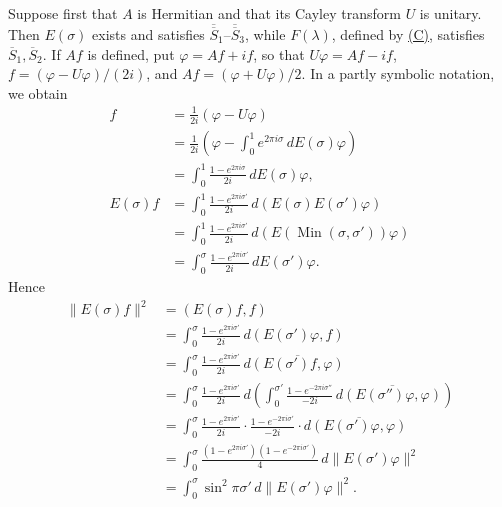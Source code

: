 \documentclass[fontsize=13pt,twoside,openany,headings=normal,parskip=false,bookmarkpackage=false,DIV=calc]{scrbook}
\begin{document}
Suppose first that $A$ is Hermitian and that its Cayley transform $U$ is unitary. Then $E(\sigma)$ exists and satisfies $\hyperref[cond:II.Sdouble1]{\overline{\overline S}_1}$--$\hyperref[cond:II.Sdouble3]{\overline{\overline S}_3}$, while $F(\lambda)$, defined by \hyperref[eq:II.9.C]{(C)}, satisfies $\hyperref[cond:II.Sbar1]{\overline S_1},\hyperref[cond:II.Sbar2]{\overline S_2}$. If $Af$ is defined, put $\varphi=Af+if$, so that $U\varphi=Af-if$, $f=(\varphi-U\varphi)/(2i)$, and $Af=(\varphi+U\varphi)/2$. In a partly symbolic notation, we obtain
\begin{align*}
f&=\frac1{2i}(\varphi-U\varphi)\\
&=\frac1{2i}\left(\varphi-\int_0^1e^{2\pi i\sigma}\,dE(\sigma)\varphi\right)\\
&=\int_0^1\frac{1-e^{2\pi i\sigma}}{2i}\,dE(\sigma)\varphi,\\
E(\sigma)f&=\int_0^1\frac{1-e^{2\pi i\sigma'}}{2i}\,d(E(\sigma)E(\sigma')\varphi)\\
&=\int_0^1\frac{1-e^{2\pi i\sigma'}}{2i}\,d(E(\operatorname{Min}(\sigma,\sigma'))\varphi)\\
&=\int_0^\sigma\frac{1-e^{2\pi i\sigma'}}{2i}\,dE(\sigma')\varphi.
\end{align*}
Hence
\begin{align*}
\|E(\sigma)f\|^2&=(E(\sigma)f,f)\\
&=\int_0^\sigma\frac{1-e^{2\pi i\sigma'}}{2i}\,d(E(\sigma')\varphi,f)\\
&=\int_0^\sigma\frac{1-e^{2\pi i\sigma'}}{2i}\,d\overline{(E(\sigma')f,\varphi)}\\
&=\int_0^\sigma\frac{1-e^{2\pi i\sigma'}}{2i}\,
d\left(\int_0^{\sigma'}\frac{1-e^{-2\pi i\sigma''}}{-2i}\,
d\overline{(E(\sigma'')\varphi,\varphi)}\right)\\
&=\int_0^\sigma\frac{1-e^{2\pi i\sigma'}}{2i}\cdot
\frac{1-e^{-2\pi i\sigma'}}{-2i}\cdot d\overline{(E(\sigma')\varphi,\varphi)}\\
&=\int_0^\sigma\frac{(1-e^{2\pi i\sigma'})(1-e^{-2\pi i\sigma'})}{4}\,
d\|E(\sigma')\varphi\|^2\\
&=\int_0^\sigma\sin^2\pi\sigma'\,d\|E(\sigma')\varphi\|^2.
\end{align*}
\end{document}
